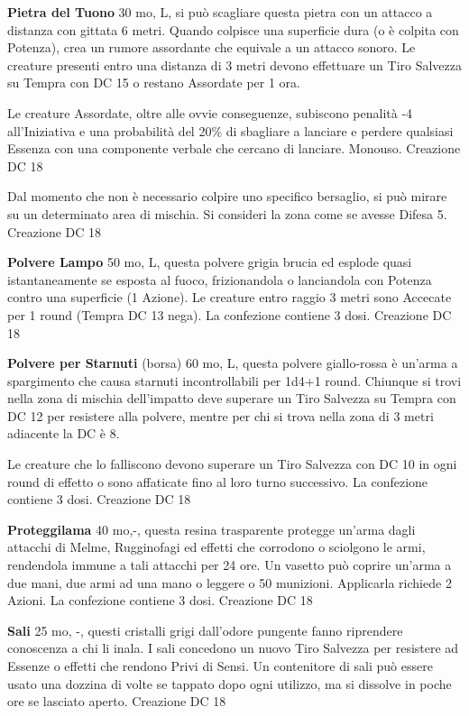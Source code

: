 \documentclass[a4paper,11pt,twoside,openany]{book}
\begin{document}
\textbf{Pietra del Tuono} 30 mo, L, si può scagliare questa pietra con un attacco a distanza con gittata 6 metri. Quando colpisce una superficie dura (o è colpita con Potenza), crea un rumore assordante che equivale a un attacco sonoro. Le creature presenti entro una distanza di 3 metri devono effettuare un Tiro Salvezza su Tempra con DC 15 o restano Assordate per 1 ora.

Le creature Assordate, oltre alle ovvie conseguenze, subiscono penalità -4 all'Iniziativa e una probabilità del 20\% di sbagliare a lanciare e perdere qualsiasi Essenza con una componente verbale che cercano di lanciare. Monouso. Creazione DC 18

Dal momento che non è necessario colpire uno specifico bersaglio, si può mirare su un determinato area di mischia. Si consideri la zona come se avesse Difesa 5. Creazione DC 18

\textbf{Polvere Lampo} 50 mo, L, questa polvere grigia brucia ed esplode quasi istantaneamente se esposta al fuoco, frizionandola o lanciandola con Potenza contro una superficie (1 Azione). Le creature entro raggio 3 metri sono Accecate per 1 round (Tempra DC 13 nega). La confezione contiene 3 dosi. Creazione DC 18

\textbf{Polvere per Starnuti} (borsa) 60 mo, L, questa polvere giallo-rossa è un'arma a spargimento che causa starnuti incontrollabili per 1d4+1 round. Chiunque si trovi nella zona di mischia dell'impatto deve superare un Tiro Salvezza su Tempra con DC 12 per resistere alla polvere, mentre per chi si trova nella zona di 3 metri adiacente la DC è 8.

Le creature che lo falliscono devono superare un Tiro Salvezza con DC 10 in ogni round di effetto o sono affaticate fino al loro turno successivo. La confezione contiene 3 dosi. Creazione DC 18

\textbf{Proteggilama} 40 mo,-, questa resina trasparente protegge un'arma dagli attacchi di Melme, Rugginofagi ed effetti che corrodono o sciolgono le armi, rendendola immune a tali attacchi per 24 ore. Un vasetto può coprire un'arma a due mani, due armi ad una mano o leggere o 50 munizioni. Applicarla richiede 2 Azioni. La confezione contiene 3 dosi. Creazione DC 18

\textbf{Sali} 25 mo, -,  questi cristalli grigi dall'odore pungente fanno riprendere conoscenza a chi li inala. I sali concedono un nuovo Tiro Salvezza per resistere ad Essenze o effetti che rendono Privi di Sensi.
Un contenitore di sali può essere usato una dozzina di volte se tappato dopo ogni utilizzo, ma si dissolve in poche ore se lasciato aperto. Creazione DC 18
\end{document}
